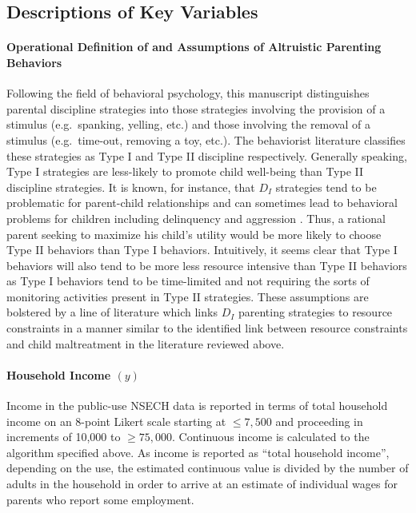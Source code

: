 \subsection{Descriptions of Key Variables}

\paragraph{Operational Definition of and Assumptions of Altruistic Parenting Behaviors}\label{assumptions-regarding-discipline-strategies}

Following the field of behavioral psychology, this manuscript distinguishes parental discipline strategies into those strategies involving the provision of a stimulus (e.g.~spanking,
yelling, etc.) and those involving the removal of a stimulus
(e.g.~time-out, removing a toy, etc.). The behaviorist literature
classifies these strategies as Type I and Type II discipline
respectively. Generally speaking, Type I strategies are less-likely to
promote child well-being than Type II discipline strategies. It is known, for instance, that $D_I$ strategies tend to be problematic for parent-child relationships and can sometimes lead to behavioral problems for children including delinquency
and aggression \citep{Gershoff2002, Taylor2010}. Thus, a rational parent seeking to maximize his child's utility would be more likely to choose Type II behaviors than Type I behaviors. Intuitively, it seems clear that Type I behaviors will also tend to be more less resource intensive than Type II behaviors as Type I behaviors tend to be time-limited and not requiring the sorts of monitoring activities present in Type II strategies. These assumptions are bolstered by a line of literature
which links $D_I$ parenting strategies to resource constraints \citep{Berger2007, Berger2008, Berger2009, Paxson2002} in a manner similar to the identified link between
resource constraints and child maltreatment in the literature reviewed
above.

\paragraph{Household Income $(y)$}\label{household-income-y}

Income in the public-use NSECH data is reported in terms of total
household income on an 8-point Likert scale starting at $\le 7,500$ and
proceeding in increments of 10,000 to $\ge 75,000$. Continuous income is
calculated to the algorithm specified above. As income is reported as
``total household income'', depending on the use, the estimated
continuous value is divided by the number of adults in the household in
order to arrive at an estimate of individual wages for parents who
report some employment.

